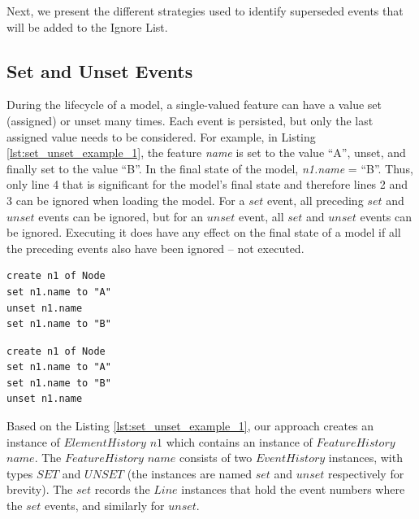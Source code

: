 \documentclass{llncs}
\begin{document}
    Next, we present the different strategies used to identify superseded events that will be added to the Ignore List.   
    
    \vspace{-10pt}
    \subsection{Set and Unset Events}
    \label{subsec:set_and_unset_operations}
    During the lifecycle of a model, a single-valued feature can have a value set (assigned) or unset many times. Each event is persisted, but only the last assigned value needs to be considered. For example, in Listing \ref{lst:set_unset_example_1}, the feature \emph{name} is set to the value ``A'', unset, and finally set to the value ``B''.  In the final state of the model, \emph{n1.name} = ``B''. Thus, only line 4 that is significant for the model's final state and therefore lines 2 and 3 can be ignored when loading the model. For a $set$ event, all preceding $set$ and $unset$ events can be ignored, but for an $unset$ event, all $set$ and $unset$ events can be ignored. Executing it does have any effect on the final state of a model if all the preceding events also have been ignored -- not executed.
    
    \vspace{-10pt}
    \begin{minipage}[t]{0.49\linewidth}
\begin{lstlisting}[style=eol,caption={A CBP representation of attribute \emph{name} assignments.},label=lst:set_unset_example_1]
create n1 of Node
set n1.name to "A"
unset n1.name
set n1.name to "B"
\end{lstlisting}
    \end{minipage}
    \hfill
    \begin{minipage}[t]{0.49\linewidth}
\begin{lstlisting}[style=eol,caption={A CBP representation of attribute \emph{name} assignments.},label=lst:set_unset_example_2]
create n1 of Node
set n1.name to "A"
set n1.name to "B"
unset n1.name
\end{lstlisting}
    \end{minipage}
    
    Based on the Listing \ref{lst:set_unset_example_1}, our approach creates an instance of $ElementHistory$ $n1$ which contains an instance of $FeatureHistory$ $name$. The $FeatureHistory$ $name$ consists of two $EventHistory$ instances, with types $SET$ and $UNSET$ (the instances are named $set$ and $unset$ respectively for brevity). The $set$ records the $Line$ instances that hold the event numbers where the $set$ events, and similarly for $unset$.
    
\end{document}
